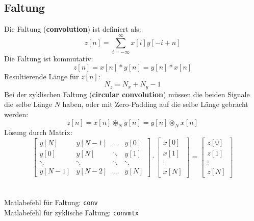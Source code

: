 \subsection{Faltung}
Die Faltung (\textbf{convolution}) ist definiert als:
\[ z[n] = \sum_{i=-\infty}^{\infty} x[i]y[-i+n] \]
Die Faltung ist kommutativ:
\[ z[n] = x[n] * y[n] = y[n] * x[n] \]
Resultierende Länge für $z[n]$:
\[ N_z = N_x + N_y -1 \]
Bei der zyklischen Faltung (\textbf{circular convolution}) müssen die beiden
Signale die selbe Länge $N$ haben, oder mit Zero-Padding auf die selbe Länge
gebracht werden:
\[ z[n] = x[n] \circledast_N y[n] = y[n] \circledast_N x[n] \]
Lösung durch Matrix:
\[
	\begin{bmatrix}
		y[N]	& y[N-1]	& \ldots & y[0] \\
		y[0]	& y[N]		& \ddots & y[1] \\
		\ddots	& \ddots	& \ddots & \ddots \\
		y[N-1]	& y[N-2]	& \ldots & y[N]
	\end{bmatrix} \cdot \begin{bmatrix}
		x[0] \\ x[1] \\ \vdots \\ x[N]
	\end{bmatrix} = \begin{bmatrix}
		z[0] \\ z[1] \\ \vdots \\ z[N]
	\end{bmatrix}
\]
~\\\\
Matlabefehl für Faltung: \verb|conv|\\
Matlabefehl für zyklische Faltung: \verb|convmtx|
